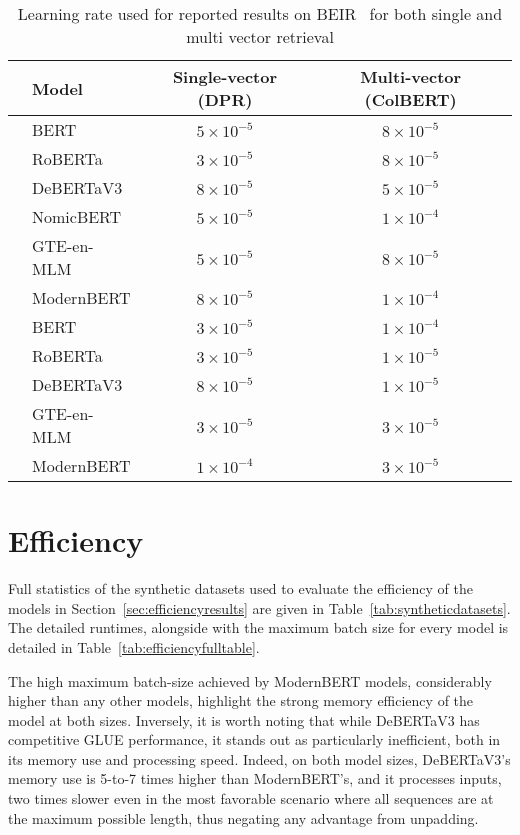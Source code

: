 \documentclass[11pt]{article}
\begin{document}
\begin{table*}[!t]
\centering
\begin{tabular}{llcc}
\toprule
& Model & Single-vector (DPR) & Multi-vector (ColBERT) \\
\midrule
\parbox[t]{3mm}{}
& BERT & $5\times10^{-5}$ & $8\times10^{-5}$ \\
& RoBERTa & $3\times10^{-5}$ & $8\times10^{-5}$ \\
& DeBERTaV3 & $8\times10^{-5}$ & $5\times10^{-5}$ \\
& NomicBERT & $5\times10^{-5}$ & $1\times10^{-4}$ \\
& GTE-en-MLM & $5\times10^{-5}$ & $8\times10^{-5}$ \\
& ModernBERT & $8\times10^{-5}$ & $1\times10^{-4}$ \\
\midrule
\parbox[t]{3mm}{}
& BERT & $3\times10^{-5}$ & $1\times10^{-4}$ \\
& RoBERTa & $3\times10^{-5}$ & $1\times10^{-5}$ \\
& DeBERTaV3 & $8\times10^{-5}$ & $1\times10^{-5}$ \\
& GTE-en-MLM & $3\times10^{-5}$ & $3\times10^{-5}$ \\
& ModernBERT & $1\times10^{-4}$ & $3\times10^{-5}$ \\
\bottomrule
\end{tabular}
\caption{Learning rate used for reported results on BEIR~\cite{BEIR} for both single and multi vector retrieval}
\label{tab:retrieval-hyperparams}
\end{table*}

\section{Efficiency}
\label{app:efficiency}
Full statistics of the synthetic datasets used to evaluate the efficiency of the models in Section~\ref{sec:efficiencyresults} are given in Table~\ref{tab:syntheticdatasets}. The detailed runtimes, alongside with the maximum batch size for every model is detailed in Table~\ref{tab:efficiencyfulltable}.


The high maximum batch-size achieved by ModernBERT models, considerably higher than any other models, highlight the strong memory efficiency of the model at both sizes. Inversely, it is worth noting that while DeBERTaV3 has competitive GLUE performance, it stands out as particularly inefficient, both in its memory use and processing speed. Indeed, on both model sizes, DeBERTaV3's memory use is 5-to-7 times higher than ModernBERT's, and it processes inputs, two times slower even in the most favorable scenario where all sequences are at the maximum possible length, thus negating any advantage from unpadding.
\end{document}
